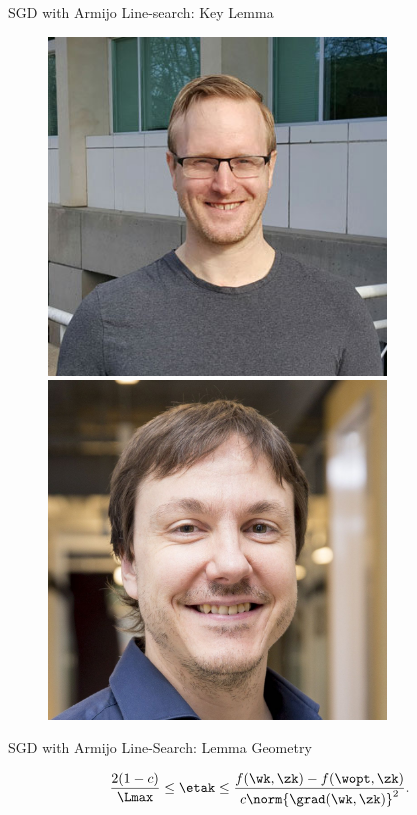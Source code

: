 \documentclass[mathserif,notheorems, hyperref={colorlinks, citecolor=blue, urlcolor=blue, linkcolor=blue}]{beamer}
\begin{document}
\begin{frame}{SGD with Armijo Line-search: Key Lemma}
\begin{minipage}[t]{0.15\textwidth}
\begin{figure}[t]
                \vspace{0.4ex}
                \includegraphics[width=0.8\textwidth]{collaborators/mark}

                \vspace{0.4ex}
                \includegraphics[width=0.8\textwidth]{collaborators/simon}
            \end{figure} 
       \end{minipage}
    \end{frame}

    \begin{frame}{SGD with Armijo Line-Search: Lemma Geometry}
        \begin{figure}[]
            \centering
            
        \end{figure} 

        \[  \frac{2 (1-c)}{\Lmax} \leq \etak \leq \frac{f(\wk, \zk) - f(\wopt, \zk)}{c \norm{\grad(\wk, \zk)}^2}. \] 
    \end{frame}
\end{document}
